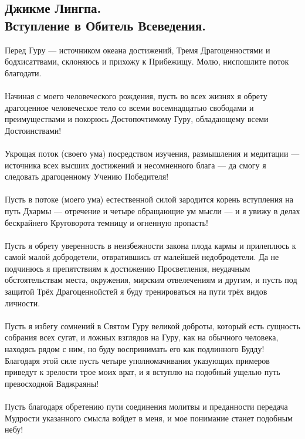 \newpage
\subsection{Джикме Лингпа.\\Вступление в Обитель Всеведения.}

Перед Гуру — источником океана достижений,
Тремя Драгоцен\-ностями и бодхисаттвами,
склоняюсь и прихожу к Прибежищу.
Молю, ниспошлите поток благодати.\\
\\
Начиная с моего человеческого рождения,
пусть во всех жизнях я обрету драгоценное человеческое тело
со всеми восемнадцатью свободами и преимуществами
и покорюсь Дос\-топочтимому Гуру,
обладающему всеми Достоинствами!\\
\\
Укрощая поток (своего ума) посредством изучения,
размышле\-ния и медитации — источника всех
высших достижений и несомненного блага —
да смогу я следовать драгоценному Учению Победителя!\\
\\
Пусть в потоке (моего ума) естественной силой
зародится корень вступления на путь Дхармы —
отречение и четыре обращающие ум мысли —
и я увижу в делах бескрайнего Круго\-ворота
темницу и огненную пропасть!\\
\\
Пусть я обрету уверенность в неизбежности закона плода кармы
и прилеплюсь к самой малой добродетели,
отвратившись от малейшей недобродетели.
Да не подчинюсь я препятствиям к достижению Просветления,
неудачным обстоятельствам места, окружения,
мирским отвелечениям и другим, и пусть под защитой
Трёх Драгоценнойстей я буду тренироваться
на пути трёх видов личности.\\
\\
Пусть я избегу сомнений в Святом Гуру великой доброты,
который есть сущность собрания всех сугат,
и ложных взглядов на Гуру, как на обычного человека,
находясь рядом с ним, но буду воспринимать его как
подлинного Будду!
\\
Благодаря этой силе пусть четыре уполномачивания
указующих примеров приведут к зрелости трое моих врат,
и я вступлю на подобный ущелью путь превосходной Ваджраяны!\\
\\
Пусть благодаря обретению пути соединения молитвы и предан\-ности
передача Мудрости указанного смысла войдет в меня,
и мое понимание станет подобным небу!\\
\\
